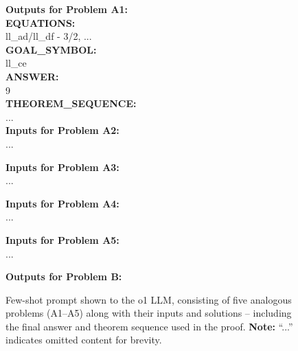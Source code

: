 \begin{figure}[t]
{\begin{minipage}{0.99\textwidth}
\textbf{Outputs for Problem A1:} \\
\textbf{EQUATIONS:} \\
ll\_ad/ll\_df - 3/2, ... \\

\textbf{GOAL\_SYMBOL:} \\
ll\_ce \\

\textbf{ANSWER:} \\
9 \\

\textbf{THEOREM\_SEQUENCE:} \\
... \\

\vspace{1em}
\textbf{Inputs for Problem A2:} \\
...

\vspace{1em}
\textbf{Inputs for Problem A3:} \\
...

\vspace{1em}
\textbf{Inputs for Problem A4:} \\
...

\vspace{1em}
\textbf{Inputs for Problem A5:} \\
...

\vspace{1em}
\textbf{Outputs for Problem B:}
\end{minipage}
}
\caption{Few-shot prompt shown to the o1 LLM, consisting of five analogous problems (A1–A5) along with their inputs and solutions -- including the final answer and theorem sequence used in the proof. \textbf{Note:} ``...'' indicates omitted content for brevity.}

\label{tab:llm_few_shot_prompt}
\end{figure}
